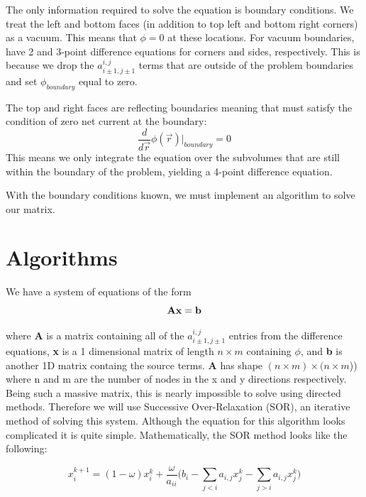 \documentclass[a4paper,12pt]{article}
\begin{document}
The only information required to solve the equation is boundary conditions. We treat the left and bottom faces (in addition to top left and bottom right corners) as a vacuum. This means that $\phi = 0$ at these locations. For vacuum boundaries, have 2 and 3-point difference equations for corners and sides, respectively. This is because we drop the $a_{i\pm1, j\pm1}^{i,j}$ terms that are outside of the problem boundaries and set $\phi_{boundary}$ equal to zero.

The top and right faces are reflecting boundaries meaning that must satisfy the condition of zero net current at the boundary:
\begin{equation}
    \frac{d}{d\vec{r}}\phi(\vec{r})|_{boundary} = 0
\end{equation}
This means we only integrate the equation over the subvolumes that are still within the boundary of the problem, yielding a 4-point difference equation.

With the boundary conditions known, we must implement an algorithm to solve our matrix.


\section{Algorithms}\label{algorithms}
We have a system of equations of the form
\begin{equation}
    \bf{A}\bf{x} = \bf{b}
\end{equation}

where {\bf A} is a matrix containing all of the $a_{i\pm1, j\pm1}^{i,j}$ entries from the difference equations, {\bf x} is a 1 dimensional matrix of length $n\times m$ containing $\phi$, and {\bf b} is another 1D matrix containg the source terms. {\bf A} has shape $(n\times m)\times (n\times m$)) where n and m are the number of nodes in the x and y directions respectively. Being such a massive matrix, this is nearly impossible to solve using directed methods. Therefore we will use Successive Over-Relaxation (SOR)\cite{Hadjidimos2000177}, an iterative method of solving this system. Although the equation for this algorithm looks complicated it is quite simple. Mathematically, the SOR method looks like the following:

\begin{equation}\label{SOR}
    x_{i}^{k+1} = (1-\omega)x_{i}^{k} + \frac{\omega}{a_{ii}}\bigg(b_{i} - \sum_{j<i}a_{i,j} x_{j}^{k} - \sum_{j>i}a_{i,j}x_{j}^{k}\bigg)
\end{equation}
\end{document}

